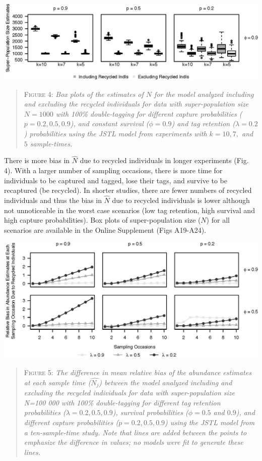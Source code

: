 \documentclass[12pt]{article}
\begin{document}
\includegraphics{RecycledPaper_files/figure-latex/Figure4_N_k-1.jpg}

\begin{quote}
\textsc{Figure 4:}
\textsl{Box plots of the estimates of $N$ for the model analyzed including and excluding the recycled individuals for data with super-population size $N=1000$ with 100\% double-tagging for different capture probabilities ($p=0.2,0.5,0.9$), and constant survival ($\phi=0.9$) and tag retention ($\lambda=0.2$) probabilities using the JSTL model from experiments with $k=10, 7,$ and $5$ sample-times. }
\end{quote}

There is more bias in \(\hat{N}\) due to recycled individuals in longer
experiments (Fig. 4). With a larger number of sampling occasions,
there is more time for individuals to be captured and tagged, lose their
tags, and survive to be recaptured (be recycled). In shorter studies,
there are fewer numbers of recycled individuals and thus the bias in
\(\hat{N}\) due to recycled individuals is lower although not
unnoticeable in the worst case scenarios (low tag retention, high
survival and high capture probabilities). Box plots of super-population
size (\(N\)) for all scenarios are available in the Online Supplement (Figs
A19-A24).

\includegraphics{RecycledPaper_files/figure-latex/Figure5_N_j-1.jpg}

\begin{quote}
\textsc{Figure 5:}
\textsl{The difference in mean relative bias of the abundance estimates at each sample time ($\hat{N_j}$) between the model analyzed including and excluding the recycled individuals for data with super-population size N=100 000 with 100\% double-tagging for different tag retention probabilities ($\lambda=0.2,0.5,0.9$), survival probabilities ($\phi=0.5$ and $0.9$), and different capture probabilities ($p=0.2,0.5,0.9$) using the JSTL model from a ten-sample-time study.  Note that lines are added between the points to emphasize the difference in values; no models were fit to generate these lines.}
\end{quote}
\end{document}
